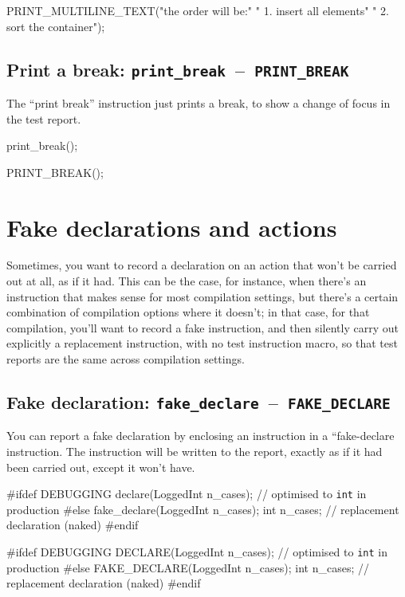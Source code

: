 \documentclass[twoside, a4paper, article]{memoir}
\newcommand*\testudocolor{\color{red!80!blue}}
\newcommand*\testudo[1]{\texttt{\testudocolor{}#1}}
\newcommand*\testudopair[2]{\testudo{#1}~--~\testudo{#2}}
\newcommand\subsectiontestudopair[3]{%
  \subsection[#1]{#1: \testudopair{#2}{#3}}}
\begin{document}
\begin{cpplisting}
PRINT_MULTILINE_TEXT("the order will be:\n"
                     "  1. insert all elements\n"
                     "  2. sort the container");
\end{cpplisting}

\subsectiontestudopair{Print a break}{print\_break}{PRINT\_BREAK}
\label{sec:print-break}

The ``print break'' instruction just prints a break, to show a change of focus
in the test report.

\begin{cpplisting}
print_break();
\end{cpplisting}

\begin{cpplisting}
PRINT_BREAK();
\end{cpplisting}


\section{Fake declarations and actions}
\label{sec:fake-declarations-actions}

Sometimes, you want to record a declaration on an action that won't be carried
out at all, as if it had.  This can be the case, for instance, when there's an
instruction that makes sense for most compilation settings, but there's a
certain combination of compilation options where it doesn't; in that case, for
that compilation, you'll want to record a fake instruction, and then silently
carry out explicitly a replacement instruction, with no test instruction macro,
so that test reports are the same across compilation settings.

\subsectiontestudopair{Fake declaration}{fake\_declare}{FAKE\_DECLARE}
\label{sec:fake-action}

You can report a fake declaration by enclosing an instruction in a
``fake-declare instruction.  The instruction will be written to the report,
exactly as if it had been carried out, except it won't have.
\begin{cpplisting}
#ifdef DEBUGGING
declare(LoggedInt n_cases); // optimised to \texttt{int} in production
#else
fake_declare(LoggedInt n_cases);
int n_cases; // replacement declaration (naked)
#endif
\end{cpplisting}

\begin{cpplisting}
#ifdef DEBUGGING
DECLARE(LoggedInt n_cases); // optimised to \texttt{int} in production
#else
FAKE_DECLARE(LoggedInt n_cases);
int n_cases; // replacement declaration (naked)
#endif
\end{cpplisting}
\end{document}
